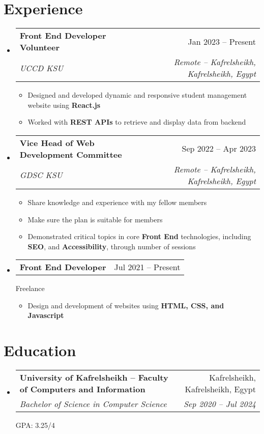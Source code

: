 \documentclass[a4paper,11pt]{article}
\makeatletter
\newcommand{\resumeItem}[1]{
  \item\small{#1}
}
\newcommand{\resumeItemListStart}{\begin{itemize}[rightmargin=0.11in]}
\newcommand{\resumeItemListEnd}{\end{itemize}}
\newcommand{\resumeQuadHeading}[4]{
  \item
  \begin{tabular*}{0.96\textwidth}[t]{l@{\extracolsep{\fill}}r}
    \textbf{#1} & #2 \\
    \textit{\small#3} & \textit{\small #4} \\
  \end{tabular*}
}
\newcommand{\resumeQuadHeadingChild}[2]{
  \item
  \begin{tabular*}{0.96\textwidth}[t]{l@{\extracolsep{\fill}}r}
    \textbf{\small#1} & {\small#2} \\
  \end{tabular*}
}
\newcommand{\resumeHeadingListStart}{
  \begin{itemize}[leftmargin=0.15in, label={}]
}
\newcommand{\resumeHeadingListEnd}{\end{itemize}}
\makeatother
\begin{document}

\section{Experience}
\resumeHeadingListStart{}
  \resumeQuadHeading{Front End Developer Volunteer}{Jan 2023 -- Present}
  {UCCD KSU}{Remote -- Kafrelsheikh, Kafrelsheikh, Egypt}
    \resumeItemListStart{}
      \resumeItem{Designed and developed dynamic and responsive student management website using \textbf{React.js}}
      \resumeItem{Worked with \textbf{REST APIs} to retrieve and display data from backend}
    \resumeItemListEnd{}

  \resumeQuadHeading{Vice Head of Web Development Committee}{Sep 2022 -- Apr 2023}
  {GDSC KSU}{Remote -- Kafrelsheikh, Kafrelsheikh, Egypt}
    \resumeItemListStart{}
      \resumeItem{Share knowledge and experience with my fellow members}
      \resumeItem{Make sure the plan is suitable for members}
      \resumeItem{Demonstrated critical topics in core \textbf{Front End} technologies, including \textbf{SEO}, and \textbf{Accessibility}, through number of sessions}
    \resumeItemListEnd{}

  \resumeQuadHeadingChild{Front End Developer}{Jul 2021 -- Present}
  {Freelance}
    \resumeItemListStart{}
      \resumeItem{Design and development of websites using \textbf{HTML, CSS, and Javascript}}
    \resumeItemListEnd{}
\resumeHeadingListEnd{}



\section{Education}
  \resumeHeadingListStart{}
    \resumeQuadHeading{University of Kafrelsheikh -- Faculty of Computers and Information}{Kafrelsheikh, Kafrelsheikh, Egypt}
    {Bachelor of Science in Computer Science}{Sep 2020 -- Jul 2024}
    {GPA: 3.25/4}
  \resumeHeadingListEnd{}


\end{document}
